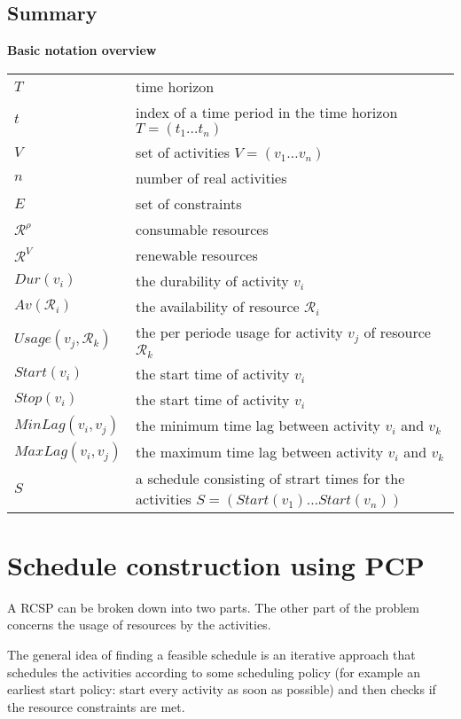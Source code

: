 \documentclass{article}
\newcommand{\leading}[1]{\textbf{#1}}
\begin{document}
\subsection{Summary}
\leading{Basic notation overview} \\
\begin{tabular}{l l}
\hline
$T$ & time horizon \\
$t$ & index of a time period in the time horizon $T = (t_1 \ldots t_n)$\\
$V$ & set of activities $V = (v_1 \ldots v_n)$ \\
$n$ & number of real activities \\
$E$ & set of constraints \\
$\mathcal{R}^{\rho}$ & consumable resources \\
$\mathcal{R}^V$ & renewable resources \\
$Dur(v_i)$ & the durability of activity $v_i$ \\
$Av(\mathcal{R}_i)$ & the availability of resource $\mathcal{R}_i$ \\
$Usage(v_j, \mathcal{R}_k)$ & the per periode usage for activity $v_j$ of resource $\mathcal{R}_k$ \\
$Start(v_i)$ & the start time of activity $v_i$ \\
$Stop(v_i)$ & the start time of activity $v_i$ \\
$MinLag(v_i, v_j)$ & the minimum time lag between activity $v_i$ and $v_k$ \\
$MaxLag(v_i, v_j)$ & the maximum time lag between activity $v_i$ and $v_k$ \\
$S$ & a schedule consisting of strart times for the activities $S = (Start(v_1) \ldots Start(v_n))$ \\
\hline
\end{tabular}




\section{Schedule construction using PCP}
A RCSP can be broken down into two parts.  The other part of the problem concerns the usage of resources by the activities. 

The general idea of finding a feasible schedule is an iterative approach that schedules the activities according to some scheduling policy (for example an earliest start policy: start every activity as soon as possible) and then checks if the resource constraints are met. 
\end{document}
